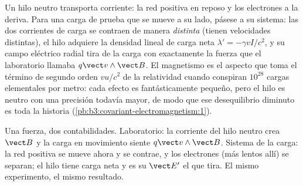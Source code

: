 \begin{example}\label{ex:b3:covariant-electromagnetism:wire}
Un hilo neutro transporta corriente: la red positiva en reposo y los
electrones a la deriva. Para una carga de prueba que se mueve a su lado,
pásese a su sistema: las dos corrientes de carga se contraen de manera
\emph{distinta} (tienen velocidades distintas), el hilo adquiere la
densidad lineal de carga neta $\lambda' =
-\gamma vI/c^2$, y su campo eléctrico radial tira de la carga con
exactamente la fuerza que el laboratorio llamaba $q\vect v\wedge\vect B$. El
magnetismo es el aspecto que toma el término de segundo orden $v u/c^2$ de
la relatividad cuando conspiran $10^{28}$ cargas elementales por metro: cada
efecto es fantásticamente pequeño, pero el hilo es neutro con una precisión
todavía mayor, de modo que ese desequilibrio diminuto es toda la historia
(\cref{pb:b3:covariant-electromagnetism:1}).
\end{example}

\begin{omfigure}

{\small Una fuerza, dos contabilidades. Laboratorio: la corriente del hilo
neutro crea $\vect B$ y la carga en movimiento siente $q\vect v\wedge\vect B$.
Sistema de la carga: la red positiva se mueve ahora y se contrae, y los
electrones (más lentos allí) se separan; el hilo tiene carga neta y es su
$\vect E'$ el que tira. El mismo experimento, el mismo resultado.}
\end{omfigure}

